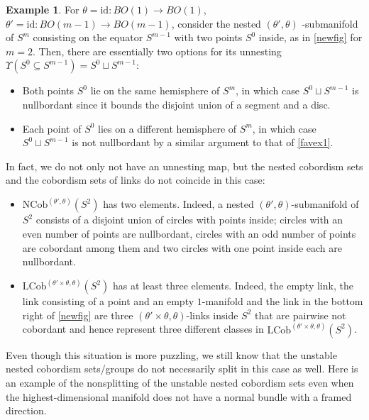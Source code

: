 \documentclass[a4paper, 11pt,reqno]{amsart}
\theoremstyle{plain}
\theoremstyle{definition}
\newtheorem{example}[theorem]{Example}
\begin{document}
\begin{example} For $\theta=\mathrm{id}\colon BO(1)\to BO(1)$, $\theta'=\mathrm{id}\colon BO(m-1)\to BO(m-1)$, consider the nested $(\theta',\theta)$ -submanifold of $S^m$ consisting on the equator $S^{m-1}$ with two points $S^0$ inside, as in \cref{newfig} for $m=2$. Then, there are essentially two options for its unnesting $\Upsilon(S^0\subseteq S^{m-1})=S^0\sqcup S^{m-1}$:
\begin{itemize}
    \item Both points $S^0$ lie on the same hemisphere of $S^m$, in which case $S^0\sqcup S^{m-1}$ is nullbordant since it bounds the disjoint union of a segment and a disc.
    \item Each point of $S^0$ lies on a different hemisphere of $S^m$, in which case $S^0\sqcup S^{m-1}$ is not nullbordant by a similar argument to that of \cref{favex1}.
\end{itemize}
In fact, we do not only not have an unnesting map, but the nested cobordism sets and the cobordism sets of links do not coincide in this case:
\begin{itemize}
    \item $\mathrm{NCob}^{(\theta',\theta)}(S^2)$ has two elements. Indeed, a nested $(\theta',\theta)$-submanifold of $S^2$ consists of a disjoint union of circles with points inside; circles with an even number of points are nullbordant, circles with an odd number of points are cobordant among them and two circles with one point inside each are nullbordant.
    \item $\mathrm{LCob}^{(\theta'\times\theta,\theta)}(S^2)$ has at least three elements. Indeed, the empty link, the link consisting of a point and an empty $1$-manifold and the link in the bottom right of \cref{newfig} are three $(\theta'\times\theta,\theta)$-links inside $S^2$ that are pairwise not cobordant and hence represent three different classes in $\mathrm{LCob}^{(\theta'\times\theta,\theta)}(S^2)$.
\end{itemize}\end{example}
Even though this situation is more puzzling, we still know that the unstable nested cobordism sets/groups do not necessarily split in this case as well. Here is an example of the nonsplitting of the unstable nested cobordism sets even when the highest-dimensional manifold does not have a normal bundle with a framed direction.
\end{document}

